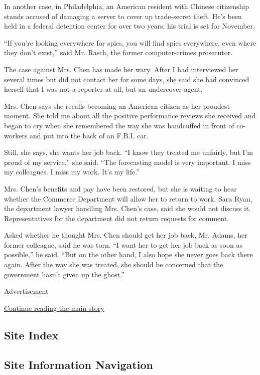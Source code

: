 In another case, in Philadelphia, an American resident with Chinese
citizenship stands accused of damaging a server to cover up trade-secret
theft. He's been held in a federal detention center for over two years;
his trial is set for November.

``If you're looking everywhere for spies, you will find spies
everywhere, even where they don't exist,'' said Mr. Rasch, the former
computer-crimes prosecutor.

The case against Mrs. Chen has made her wary. After I had interviewed
her several times but did not contact her for some days, she said she
had convinced herself that I was not a reporter at all, but an
undercover agent.

Mrs. Chen says she recalls becoming an American citizen as her proudest
moment. She told me about all the positive performance reviews she
received and began to cry when she remembered the way she was handcuffed
in front of co-workers and put into the back of an F.B.I. car.

Still, she says, she wants her job back. ``I know they treated me
unfairly, but I'm proud of my service,'' she said. ``The forecasting
model is very important. I miss my colleagues. I miss my work. It's my
life.''

Mrs. Chen's benefits and pay have been restored, but she is waiting to
hear whether the Commerce Department will allow her to return to work.
Sara Ryan, the department lawyer handling Mrs. Chen's case, said she
would not discuss it. Representatives for the department did not return
requests for comment.

Asked whether he thought Mrs. Chen should get her job back, Mr. Adams,
her former colleague, said he was torn. ``I want her to get her job back
as soon as possible,'' he said. ``But on the other hand, I also hope she
never goes back there again. After the way she was treated, she should
be concerned that the government hasn't given up the ghost.''

Advertisement

\protect\hyperlink{after-bottom}{Continue reading the main story}

\hypertarget{site-index}{%
\subsection{Site Index}\label{site-index}}

\hypertarget{site-information-navigation}{%
\subsection{Site Information
Navigation}\label{site-information-navigation}}

